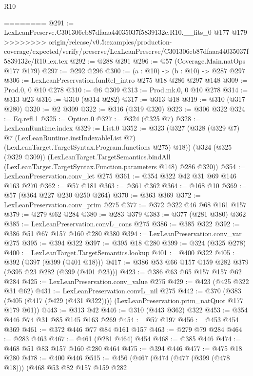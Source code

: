 \begin{lexlean}{R10}
\begin{coremodule}
{{{{{========
@291 := LexLeanPreserve.C301306eb87dfaaa44035037f5839132e.R10.__fits_0 @177 @179
>>>>>>>> origin/release/v0.5:examples/production-coverage/expected/verify/preserve/LexLeanPreserve/C301306eb87dfaaa44035037f5839132e/R10.lex.tex
@292 := @288 @291
@296 := @57 (Coverage.Main.natOps @177 @179)
@297 := @292 @296
@300 := (a : @10) -> (b : @10) -> @287 @297
@306 := LexLeanPreservation.funRel_intro @275 @18 @286 @297 @148
@309 := Prod.{0, 0} @10 @278
@310 := @6 @309
@313 := Prod.mk.{0, 0} @10 @278
@314 := @313 @23
@316 := @310 (@314 @282)
@317 := @313 @18
@319 := @310 (@317 @280)
@320 := @2 @309
@322 := @316 (@319 @320)
@323 := @306 @322
@324 := Eq.refl.{1}
@325 := Option.{0}
@327 := @324 (@325 @7)
@328 := LexLeanRuntime.index
@329 := List.{0}
@352 := @323
    (@327
      (@328
        (@329 @7)
        @7
        (LexLeanRuntime.instIndexableList @7)
        (LexLeanTarget.TargetSyntax.Program.functions @275)
        @18))
    (@324
      (@325 (@329 @309))
      (LexLeanTarget.TargetSemantics.bindAll
        (LexLeanTarget.TargetSyntax.Function.parameters @148)
        @286
        @320))
@354 := LexLeanPreservation.conv_let @275
@361 := @354 @322 @42 @31 @69 @146 @163 @270
@362 := @57 @181
@363 := @361 @362
@364 := @168 @10
@369 := @57 (@364 @227 @230 @250 @264)
@370 := @363 @369
@372 := LexLeanPreservation.conv_prim @275
@377 := @372 @322 @46 @68 @161 @157
@379 := @279 @62 @284
@380 := @283 @379
@383 := @377 (@281 @380) @362
@385 := LexLeanPreservation.convL_cons @275
@386 := @385 @322
@392 := @386 @51 @67 @157 @160 @280 @380
@394 := LexLeanPreservation.conv_var @275
@395 := @394 @322
@397 := @395 @18 @280
@399 := @324 (@325 @278)
@400 := LexLeanTarget.TargetSemantics.lookup
@401 := @400 @322
@405 := @392 (@397 (@399 (@401 @18)))
@417 := @386 @53 @66 @157 @159 @282 @379 (@395 @23 @282 (@399 (@401 @23)))
@423 := @386 @63 @65 @157 @157 @62 @284
@425 := LexLeanPreservation.conv_value @275
@429 := @423 (@425 @322 @31 @62)
@431 := LexLeanPreservation.convL_nil @275
@442 := @370
    (@383 (@405 (@417 (@429 (@431 @322)))) (LexLeanPreservation.prim_natQuot @177 @179 @61))
@443 := @313 @42
@446 := @310 (@443 @362) @322
@453 := @354 @446 @74 @31 @85 @145 @163 @269
@454 := @57 @197
@456 := @453 @454 @369
@461 := @372 @446 @77 @84 @161 @157
@463 := @279 @79 @284
@464 := @283 @463
@467 := @461 (@281 @464) @454
@468 := @385 @446
@474 := @468 @51 @83 @157 @160 @280 @464
@475 := @394 @446
@477 := @475 @18 @280
@478 := @400 @446
@515 := @456
    (@467
      (@474
        (@477 (@399 (@478 @18)))
        (@468
          @53
          @82
          @157
          @159
          @282
}}}}}
\end{coremodule}
\end{lexlean}
